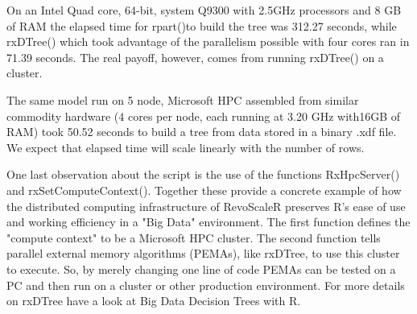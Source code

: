 On an Intel Quad core, 64-bit, system Q9300 with 2.5GHz processors and 8 GB of RAM the elapsed time 
for rpart()to build the tree was 312.27 seconds, while rxDTree() which took advantage of the parallelism 
possible with four cores ran in 71.39 seconds. The real payoff, however, comes from running rxDTree() on a cluster. 

The same model run on 5 node, Microsoft HPC assembled from similar commodity hardware (4 cores per node, each running 
at 3.20 GHz with16GB of RAM) took 50.52 seconds to build a tree from data stored in a binary .xdf file. We expect that 
elapsed time will scale linearly with the number of rows.

One last observation about the script is the use of the functions RxHpcServer() and rxSetComputeContext(). Together these provide a concrete example of how the distributed computing infrastructure of RevoScaleR preserves R's ease of use and working efficiency in a "Big Data" environment. The first function defines the "compute context" to be a Microsoft HPC cluster. The second function tells parallel external memory algorithms (PEMAs), like rxDTree, to use this cluster to execute. So, by merely changing one line of code PEMAs can be tested on a PC and then run on a cluster or other production environment. For more details on rxDTree have a look at Big Data Decision Trees with R.

